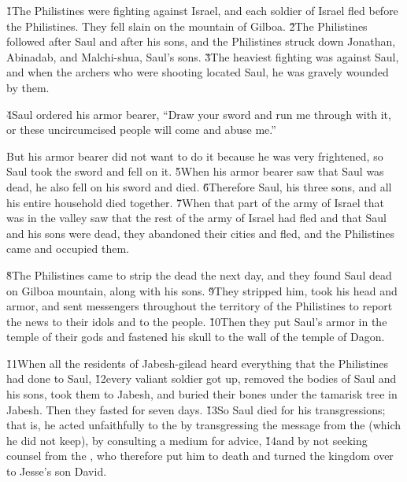 \v{1}The Philistines were fighting against Israel, and each soldier of Israel fled before the Philistines. They fell slain on the mountain of Gilboa. \v{2}The Philistines followed after Saul and after his sons, and the Philistines struck down Jonathan, Abinadab, and Malchi-shua, Saul's sons. \v{3}The heaviest fighting was against Saul, and when the archers who were shooting located Saul, he was gravely wounded by them.

\v{4}Saul ordered his armor bearer, ``Draw your sword and run me through with it, or these uncircumcised people will come and abuse me.''

But his armor bearer did not want to do it because he was very frightened, so Saul took the sword and fell on it. \v{5}When his armor bearer saw that Saul was dead, he also fell on his sword and died. \v{6}Therefore Saul, his three sons, and all his entire household died together. \v{7}When that part of the army of Israel that was in the valley saw that the rest of the army of Israel had fled and that Saul and his sons were dead, they abandoned their cities and fled, and the Philistines came and occupied them.

\v{8}The Philistines came to strip the dead the next day, and they found Saul dead on Gilboa mountain, along with his sons. \v{9}They stripped him, took his head and armor, and sent messengers throughout the territory of the Philistines to report the news to their idols and to the people. \v{10}Then they put Saul's armor in the temple of their gods and fastened his skull to the wall of the temple of Dagon.

\v{11}When all the residents of Jabesh-gilead heard everything that the Philistines had done to Saul, \v{12}every valiant soldier got up, removed the bodies of Saul and his sons, took them to Jabesh, and buried their bones under the tamarisk tree in Jabesh. Then they fasted for seven days. \v{13}So Saul died for his transgressions; that is, he acted unfaithfully to the  by transgressing the message from the  (which he did not keep), by consulting a medium for advice, \v{14}and by not seeking counsel from the , who therefore put him to death and turned the kingdom over to Jesse's son David.

